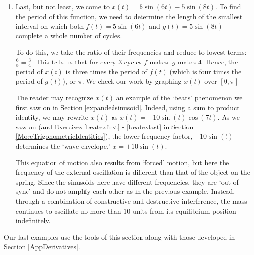 \documentclass{ximera}
\begin{document}
\begin{example}
\begin{enumerate}
\item Last, but not least, we come to  $x(t) = 5\sin(6t) - 5\sin(8t)$.  To find the period of this function, we need to determine the length of the smallest interval on which both $f(t) = 5\sin(6t)$ and $g(t) = 5\sin(8t)$ complete a whole number of cycles. 

 

To do this, we take the ratio of their frequencies and reduce to lowest terms:  $\frac{6}{8} = \frac{3}{4}$.  This tells us that for every $3$ cycles $f$ makes, $g$ makes $4$. Hence,  the period of $x(t)$ is three times the period of $f(t)$ (which is four times the period of $g(t)$), or $\pi$.   We check our work by graphing $x(t)$  over  $[0,\pi]$

 

The reader may recognize $x(t)$  an example of the `beats' phenomenon we first saw on \pageref{beats} in Section \ref{expandedsinusoid}.  Indeed, using a sum to product identity, we may rewrite $x(t)$ as $x(t) =  -10 \sin(t) \cos(7t)$.  As we saw on \pageref{beats}  (and Exercises \ref{beatexfirst} - \ref{beatexlast} in Section \ref{MoreTrigonometricIdentities}), the lower frequency factor, $-10\sin(t)$ determines the `wave-envelope,'   $x = \pm 10 \sin(t)$.  

\begin{center}
\end{center}

 This equation of motion also results from `forced' motion, but here the frequency of the external oscillation is different than that of the object on the spring.  Since the sinusoids here have different frequencies, they are `out of sync' and  do not amplify each other as in the previous example.  Instead, through a combination of constructive and destructive interference, the mass continues to oscillate no more than $10$ units from its equilibrium position indefinitely.  


\end{enumerate}

\end{example}

Our last examples use the tools of this section along with those developed in Section \ref{AppDerivatives}.
\end{document}
